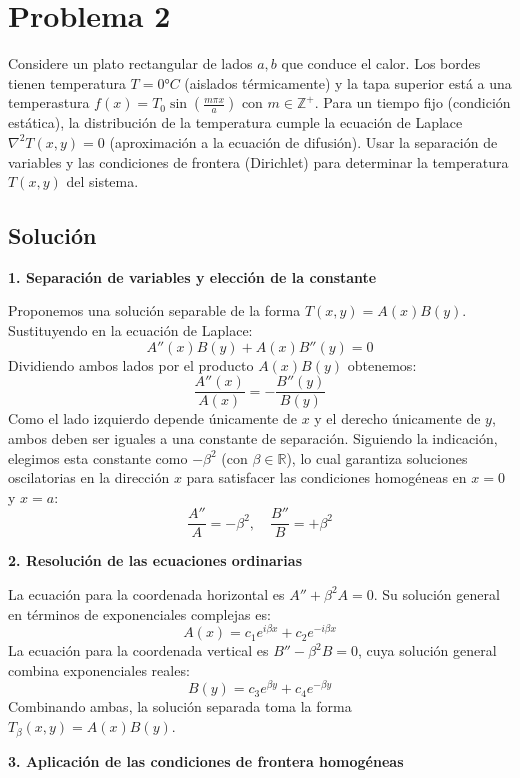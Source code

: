 \documentclass[a4paper]{article}
\begin{document}
\section{Problema 2}

Considere un plato rectangular de lados $a,b$ que conduce el calor. Los bordes tienen temperatura $T=0° C$ (aislados térmicamente) y la tapa superior está a una temperastura $f(x) = T_0 \sin\left(\frac{m\pi x}{a}\right)$ con $m\in \mathbb{Z}^+$. Para un tiempo fijo (condición estática), la distribución de la temperatura cumple la ecuación de Laplace $\nabla^2T(x, y) = 0$ (aproximación a la ecuación de difusión). Usar la separación de variables y  las condiciones de frontera (Dirichlet) para determinar la temperatura $T(x, y)$ del sistema.


\subsection{Solución}


\textbf{1. Separación de variables y elección de la constante}

Proponemos una solución separable de la forma $T(x, y) = A(x)B(y)$. Sustituyendo en la ecuación de Laplace:
$$ A''(x)B(y) + A(x)B''(y) = 0 $$
Dividiendo ambos lados por el producto $A(x)B(y)$ obtenemos:
$$ \frac{A''(x)}{A(x)} = -\frac{B''(y)}{B(y)} $$
Como el lado izquierdo depende únicamente de $x$ y el derecho únicamente de $y$, ambos deben ser iguales a una constante de separación. Siguiendo la indicación, elegimos esta constante como $-\beta^2$ (con $\beta \in \mathbb{R}$), lo cual garantiza soluciones oscilatorias en la dirección $x$ para satisfacer las condiciones homogéneas en $x=0$ y $x=a$:
$$ \frac{A''}{A} = -\beta^2, \quad \frac{B''}{B} = +\beta^2 $$

\textbf{2. Resolución de las ecuaciones ordinarias}

La ecuación para la coordenada horizontal es $A'' + \beta^2 A = 0$. Su solución general en términos de exponenciales complejas es:
$$ A(x) = c_1 e^{i\beta x} + c_2 e^{-i\beta x} $$
La ecuación para la coordenada vertical es $B'' - \beta^2 B = 0$, cuya solución general combina exponenciales reales:
$$ B(y) = c_3 e^{\beta y} + c_4 e^{-\beta y} $$
Combinando ambas, la solución separada toma la forma $T_\beta(x, y) = A(x)B(y)$.

\textbf{3. Aplicación de las condiciones de frontera homogéneas}
\end{document}
